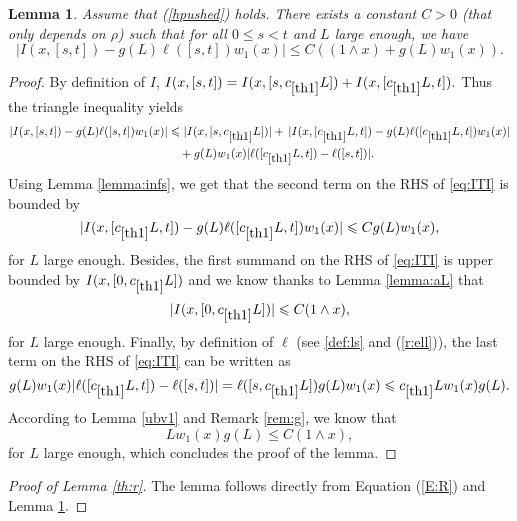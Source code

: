 \documentclass[11pt]{article}
\theoremstyle{plain}
\newtheorem{lemma}{Lemma}[section]
\begin{document}
\begin{lemma} \label{th:I} Assume that (\ref{hpushed}) holds. There exists a constant $C>0$ (that only depends on $\rho$) such that for all $0\leqslant s<t$ and $L$ large enough, we have \begin{equation*}
    |I(x,[s,t])-g(L)\ell([s,t])w_1(x)|\leqslant C((1\wedge x)+ g(L)w_1(x)). 
\end{equation*}
\end{lemma}
\begin{proof} By definition of $I$, $I(x,[s,t])=I(x,[s,c_{\ref{th1}}L])+I(x,[c_{\ref{th1}}L,t]).$ Thus the triangle inequality yields
 \begin{align}
|I(x,[s,t])-g(L)\ell([s,t])w_1(x)|&\leqslant |I(x,[s,c_{\ref{th1}}L])|  +\,|I(x,[c_{\ref{th1}}L,t])-g(L)\ell([c_{\ref{th1}}L,t])w_1(x)|\nonumber\\
& \quad +g(L)w_1(x)|\ell([c_{\ref{th1}}L,t])-\ell([s,t])|.\label{eq:ITI}
\end{align}
Using Lemma \ref{lemma:infs}, we get that the second term on the RHS of \eqref{eq:ITI} is bounded by
\begin{equation*}
|I(x,[c_{\ref{th1}}L,t])-g(L)\ell([c_{\ref{th1}}L,t])w_1(x)|\leqslant Cg(L)w_1(x),
\end{equation*}
for $L$ large enough.
Besides, the first summand on the RHS of \eqref{eq:ITI} is upper bounded by $I(x,[0,c_{\ref{th1}}L])$ and we know thanks to Lemma \ref{lemma:aL} that
$$|I(x,[0,c_{\ref{th1}}L])|\leqslant C(1\wedge x),$$
for $L$ large enough.
Finally, by definition of $\ell$ (see  \eqref{def:ls} and (\ref{r:ell})), the last term on the RHS of \eqref{eq:ITI} can be written as
\begin{equation*}
 g(L)w_1(x)|\ell([c_{\ref{th1}}L,t])-\ell([s,t])|= \ell([s,c_{\ref{th1}}L])g(L)w_1(x)\leqslant c_{\ref{th1}}Lw_1(x)g(L).
\end{equation*}
According to Lemma \ref{ubv1} and Remark \ref{rem:g}, we know that
 $$Lw_1(x)g(L)\leqslant  C(1\wedge x),$$
for $L$ large enough, which concludes the proof of the lemma.
\end{proof}

\begin{proof}[Proof of Lemma \ref{th:r}] The lemma follows directly from Equation (\ref{E:R}) and Lemma \ref{th:I}.
\end{proof}
\end{document}
